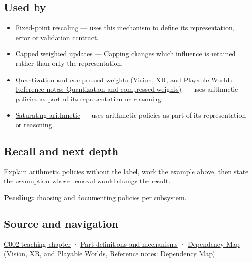 \subsection{Used by}\label{appendix-2ed044358b82-used-by}

\hypertarget{appendix-2ed044358b82-used-by}{}

\begin{itemize}
\item
  \hyperref[appendix-3333db47830f]{Fixed-point rescaling} --- uses this mechanism to define its representation, error or validation contract.
\item
  \hyperref[appendix-1e45d0613db3]{Capped weighted updates} --- Capping changes which influence is retained rather than only the representation.
\item
  \href{../07-Vision-XR-and-Playable-Worlds/main.pdf\#nameddest=appendix-fdc7879e8bf2}{Quantization and compressed weights (Vision, XR, and Playable Worlds, Reference notes: Quantization and compressed weights)} --- uses arithmetic policies as part of its representation or reasoning.
\item
  \hyperref[appendix-3999c6209649]{Saturating arithmetic} --- uses arithmetic policies as part of its representation or reasoning.
\end{itemize}

\subsection{Recall and next depth}\label{appendix-2ed044358b82-recall-and-next-depth}

\hypertarget{appendix-2ed044358b82-recall-and-next-depth}{}

Explain arithmetic policies without the label, work the example above, then state the assumption whose removal would change the result.

\textbf{Pending:} choosing and documenting policies per subsystem.

\subsection{Source and navigation}\label{appendix-2ed044358b82-source-and-navigation}

\hypertarget{appendix-2ed044358b82-source-and-navigation}{}

\hyperref[01-foundations-i-ch001-arithmetic-becomes-a-policy]{C002 teaching chapter} · \hyperref[appendix-fd090d982a15]{Part definitions and mechanisms} · \href{../07-Vision-XR-and-Playable-Worlds/main.pdf\#nameddest=appendix-4ad47bdd269a}{Dependency Map (Vision, XR, and Playable Worlds, Reference notes: Dependency Map)}
